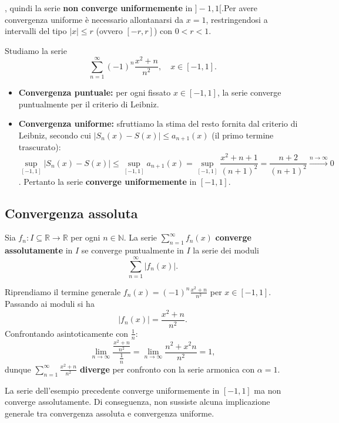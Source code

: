 \begin{example}
\begin{itemize}
, quindi la serie \textbf{non converge uniformemente} in $]-1, 1[$.Per avere convergenza uniforme è necessario allontanarsi da $x = 1$, restringendosi a intervalli del tipo $\vert{}x\vert{} \le r$ (ovvero $[-r, r]$) con $0 < r < 1$.
\end{itemize}
\end{example}\begin{example}
Studiamo la serie
$$\sum_{n=1}^{\infty} (-1)^n \frac{x^2 + n}{n^2}, \quad x \in [-1, 1].$$
\begin{itemize}
\item \textbf{Convergenza puntuale:} per ogni fissato $x \in [-1, 1]$, la serie converge puntualmente per il criterio di Leibniz.
\item \textbf{Convergenza uniforme:} sfruttiamo la stima del resto fornita dal criterio di Leibniz, secondo cui $\vert{}S_n(x) - S(x)\vert{} \le a_{n+1}(x)$ (il primo termine trascurato):
$$\sup_{[-1, 1]} \vert{}S_n(x) - S(x)\vert{} \le \sup_{[-1, 1]} a_{n+1}(x) = \sup_{[-1, 1]} \frac{x^2 + n + 1}{(n+1)^2} = \frac{n + 2}{(n+1)^2} \xrightarrow{n \to \infty} 0$$
. Pertanto la serie \textbf{converge uniformemente} in $[-1, 1]$.
\end{itemize}
\end{example}

\subsection{Convergenza assoluta}

\begin{definition}
Sia $f_n : I \subseteq \mathbb{R} \to \mathbb{R}$ per ogni $n \in \mathbb{N}$. La serie $\sum_{n=1}^{\infty} f_n(x)$ \textbf{converge assolutamente} in $I$ se converge puntualmente in $I$ la serie dei moduli
$$\sum_{n=1}^{\infty} \vert{}f_n(x)\vert{}.$$
\end{definition}\begin{example}
Riprendiamo il termine generale $f_n(x) = (-1)^n \frac{x^2 + n}{n^2}$ per $x \in [-1, 1]$. Passando ai moduli si ha
$$\vert{}f_n(x)\vert{} = \frac{x^2 + n}{n^2}.$$
Confrontando asintoticamente con $\frac{1}{n}$:
$$\lim_{n \to \infty} \frac{\frac{x^2 + n}{n^2}}{\frac{1}{n}} = \lim_{n \to \infty} \frac{n^2 + x^2 n}{n^2} = 1,$$
dunque $\sum_{n=1}^{\infty} \frac{x^2 + n}{n^2}$ \textbf{diverge} per confronto con la serie armonica con $\alpha = 1$.
\end{example}\begin{oss}
La serie dell'esempio precedente converge uniformemente in $[-1, 1]$ ma non converge assolutamente. Di conseguenza, non sussiste alcuna implicazione generale tra convergenza assoluta e convergenza uniforme.
\end{oss}

